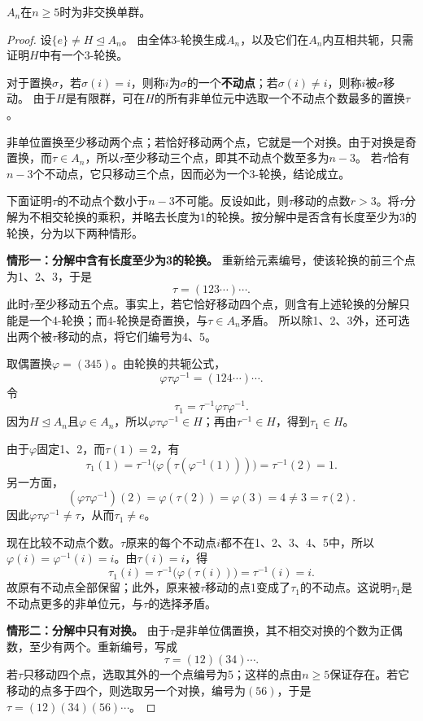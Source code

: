 \begin{theorem}\label{p2:an-simple}
$A_n$在$n\geq5$时为非交换单群。
\end{theorem}
\begin{proof}
设$\{e\}\neq H\trianglelefteq A_n$。
由全体3-轮换生成$A_n$，以及它们在$A_n$内互相共轭，只需证明$H$中有一个3-轮换。

\label{p2:concept:c2-l405}对于置换$\sigma$，若$\sigma(i)=i$，则称$i$为$\sigma$的一个\textbf{不动点}；若$\sigma(i)\ne i$，则称$i$被$\sigma$移动。
由于$H$是有限群，可在$H$的所有非单位元中选取一个不动点个数最多的置换$\tau$。

非单位置换至少移动两个点；若恰好移动两个点，它就是一个对换。由于对换是奇置换，而$\tau\in A_n$，所以$\tau$至少移动三个点，即其不动点个数至多为$n-3$。
若$\tau$恰有$n-3$个不动点，它只移动三个点，因而必为一个3-轮换，结论成立。

下面证明$\tau$的不动点个数小于$n-3$不可能。反设如此，则$\tau$移动的点数$r>3$。将$\tau$分解为不相交轮换的乘积，并略去长度为1的轮换。按分解中是否含有长度至少为3的轮换，分为以下两种情形。

\textbf{情形一：分解中含有长度至少为3的轮换。}
重新给元素编号，使该轮换的前三个点为1、2、3，于是
\[
\tau=(123\cdots)\cdots.
\]
此时$\tau$至少移动五个点。事实上，若它恰好移动四个点，则含有上述轮换的分解只能是一个4-轮换；而4-轮换是奇置换，与$\tau\in A_n$矛盾。
所以除1、2、3外，还可选出两个被$\tau$移动的点，将它们编号为4、5。

取偶置换$\varphi=(345)$。由轮换的共轭公式，
\[
\varphi\tau\varphi^{-1}=(124\cdots)\cdots.
\]
令
\[
\tau_1=\tau^{-1}\varphi\tau\varphi^{-1}.
\]
因为$H\trianglelefteq A_n$且$\varphi\in A_n$，所以$\varphi\tau\varphi^{-1}\in H$；再由$\tau^{-1}\in H$，得到$\tau_1\in H$。

由于$\varphi$固定1、2，而$\tau(1)=2$，有
\[
\tau_1(1)
=\tau^{-1}\bigl(\varphi(\tau(\varphi^{-1}(1)))\bigr)
=\tau^{-1}(2)=1.
\]
另一方面，
\[
(\varphi\tau\varphi^{-1})(2)=\varphi(\tau(2))=\varphi(3)=4
\ne3=\tau(2).
\]
因此$\varphi\tau\varphi^{-1}\ne\tau$，从而$\tau_1\ne e$。

现在比较不动点个数。$\tau$原来的每个不动点$i$都不在1、2、3、4、5中，所以$\varphi(i)=\varphi^{-1}(i)=i$。由$\tau(i)=i$，得
\[
\tau_1(i)=\tau^{-1}\bigl(\varphi(\tau(i))\bigr)=\tau^{-1}(i)=i.
\]
故原有不动点全部保留；此外，原来被$\tau$移动的点1变成了$\tau_1$的不动点。这说明$\tau_1$是不动点更多的非单位元，与$\tau$的选择矛盾。

\textbf{情形二：分解中只有对换。}
由于$\tau$是非单位偶置换，其不相交对换的个数为正偶数，至少有两个。重新编号，写成
\[
\tau=(12)(34)\cdots.
\]
若$\tau$只移动四个点，选取其外的一个点编号为5；这样的点由$n\geq5$保证存在。若它移动的点多于四个，则选取另一个对换，编号为$(56)$，于是$\tau=(12)(34)(56)\cdots$。


\end{proof}
